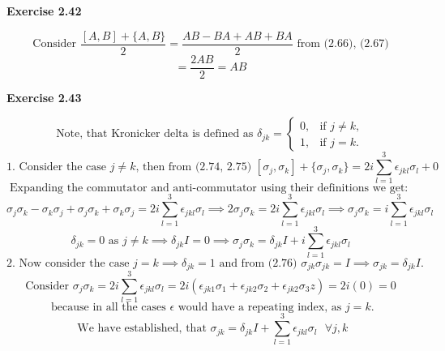 \documentclass{article}
\begin{document}
\bigskip

\begin{framed}
    \noindent \textbf{Exercise 2.42}
    
    \medskip
    $$
    \text{Consider }  \frac{[A,B] +\{A,B\}}{2} = \frac{AB - BA + AB + BA}{2} \text{ from (2.66), (2.67)}
    $$
    $$
    = \frac{2AB}{2} = AB
    $$
    
\end{framed}

\bigskip

\begin{framed}
    \noindent \textbf{Exercise 2.43}
    
    \medskip
    \begin{equation*}
        \text{Note, that Kronicker delta is defined as } \delta_{jk} =
        \begin{cases}
            0, & \text{if } j \neq k, \\
            1, & \text{if } j = k.
        \end{cases}
    \end{equation*}
    \begin{equation*}
        \text{1. Consider the case } j\neq k \text{, then from (2.74, 2.75) } [\sigma_j, \sigma_k] + \{\sigma_j, \sigma_k \} = 2i\sum_{l=1}^{3}\epsilon_{jkl}\sigma_l + 0
    \end{equation*}
    \begin{equation*}
        \text{Expanding the commutator and anti-commutator using their definitions we get: }
    \end{equation*}
    \begin{equation*}
        \sigma_j\sigma_k - \sigma_k\sigma_j + \sigma_j\sigma_k + \sigma_k\sigma_j = 2i\sum_{l=1}^{3}\epsilon_{jkl}\sigma_l \implies 2\sigma_j\sigma_k = 2i\sum_{l=1}^{3}\epsilon_{jkl}\sigma_l \implies
        \sigma_j\sigma_k = i\sum_{l=1}^{3}\epsilon_{jkl}\sigma_l
    \end{equation*}
    \begin{equation*}
        \delta_{jk} = 0 \text{ as } j \neq k \implies \delta_{jk}I = 0 \implies \sigma_j\sigma_k = \delta_{jk}I + i\sum_{l=1}^{3}\epsilon_{jkl}\sigma_l
    \end{equation*}
    \begin{equation*}
        \text{2. Now consider the case } j = k \implies \delta_{jk} = 1 \text{ and from (2.76) } \sigma_{jk}\sigma_{jk} = I \implies \sigma_{jk} = \delta_{jk}I.
    \end{equation*}
    \begin{equation*}
        \text{Consider }\sigma_j\sigma_k = 2i\sum_{l=1}^{3}\epsilon_{jkl}\sigma_l = 2i(\epsilon_{jk1}\sigma_1+\epsilon_{jk2}\sigma_2+\epsilon_{jk2}\sigma_3z) = 2i(0) = 0
    \end{equation*}
    \begin{equation*}
        \text{ because in all the cases } \epsilon \text{ would have a repeating index, as } j = k.
    \end{equation*}
    \begin{equation*}
        \text{ We have established, that } \sigma_{jk} = \delta_{jk}I + \sum_{l=1}^3{\epsilon_{jkl}\sigma_l} \text{ } \forall j,k
    \end{equation*}


\end{framed}
\end{document}
